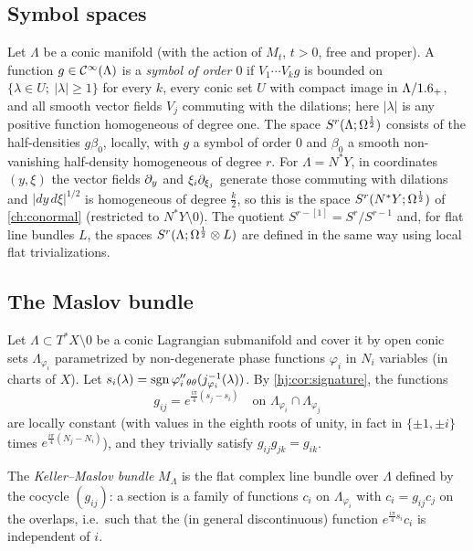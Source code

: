 \subsection{Symbol spaces}
Let $\Lambda$ be a conic manifold (with the action of $M_t$, $t>0$, free and
proper).  A function $g\in\mathcal{C}^\infty(\Lambda)$ is a \emph{symbol of order $0$} if
$V_1\cdots V_kg$ is bounded on $\{\lambda\in U;\ |\lambda|\ge1\}$ for every $k$,
every conic set $U$ with compact image in $\Lambda/1.6_+$, and all smooth vector
fields $V_j$ commuting with the dilations; here $|\lambda|$ is any positive
function homogeneous of degree one.  The space $S^r(\Lambda;\Omega^{\frac12})$ consists
of the half-densities $g\beta_0$, locally, with $g$ a symbol of order $0$ and
$\beta_0$ a smooth non-vanishing half-density homogeneous of degree $r$.  For
$\Lambda=N^*Y$, in coordinates $(y,\xi)$ the vector fields $\partial_y$ and
$\xi_i\partial_{\xi_j}$ generate those commuting with dilations and
$|dy\,d\xi|^{1/2}$ is homogeneous of degree $\frac k2$, so this is the space
$S^r(N^*Y;\Omega^{\frac12})$ of \cref{ch:conormal} (restricted to $N^*Y\setminus0$).
The quotient $S^{r-[1]}=S^r/S^{r-1}$ and, for flat line bundles $L$, the
spaces $S^r(\Lambda;\Omega^{\frac12}\otimes L)$ are defined in the same way using local
flat trivializations.

\subsection{The Maslov bundle}
Let $\Lambda\subset T^*X\setminus0$ be a conic Lagrangian submanifold and cover
it by open conic sets $\Lambda_{\varphi_i}$ parametrized by non-degenerate phase
functions $\varphi_i$ in $N_i$ variables (in charts of $X$).  Let
$s_i(\lambda)=\operatorname{sgn}\varphi_i''{}_{\theta\theta}(j_{\varphi_i}^{-1}(\lambda))$.
By \cref{hj:cor:signature}, the functions
\begin{equation*}
  g_{ij}=e^{\frac{i\pi}4(s_j-s_i)}\quad\text{on }\Lambda_{\varphi_i}\cap
  \Lambda_{\varphi_j}
\end{equation*}
are locally constant (with values in the eighth roots of unity, in fact in
$\{\pm1,\pm i\}$ times $e^{\frac{i\pi}4(N_j-N_i)}$), and they trivially satisfy
$g_{ij}g_{jk}=g_{ik}$.

\begin{definition}\label{hj:def:maslov}
  The \emph{Keller--Maslov bundle} $M_\Lambda$ is the flat complex line bundle
  over $\Lambda$ defined by the cocycle $(g_{ij})$: a section is a family of
  functions $c_i$ on $\Lambda_{\varphi_i}$ with $c_i=g_{ij}c_j$ on the overlaps,
  i.e.\ such that the (in general discontinuous) function
  $e^{\frac{i\pi}4s_i}c_i$ is independent of $i$.
\end{definition}

